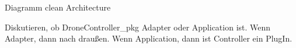 

Diagramm clean Architecture



Diskutieren, ob DroneController\_pkg Adapter oder Application ist.
Wenn Adapter, dann nach draußen.
Wenn Application, dann ist Controller ein PlugIn.
